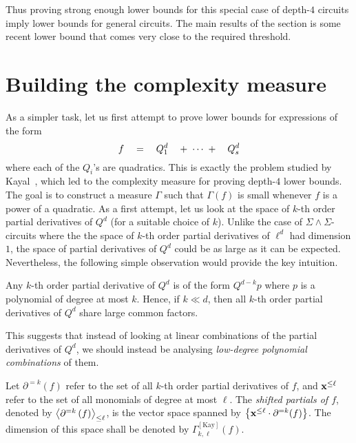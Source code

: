 \documentclass[12pt]{report}
\newcommand{\CM}[1]{\Gamma^{\mathrm{[#1]}}}
\newcommand{\SPD}[3]{\inangle{\partial^{=#1}\inparen{#3}}_{\leq #2}}
\begin{document}
Thus proving strong enough lower bounds for this special case of depth-$4$ circuits imply lower bounds for general circuits. The main results of the section is some recent lower bound \cite{gkks13,KSS13,FLMS13} that comes very close to the required threshold. 

\section{Building the complexity measure}

As a simpler task, let us first attempt to prove lower bounds for expressions of the form
$$
f \quad = \quad Q_1^{d} \quad + \;\cdots\; +  \quad Q_s^{d}
$$
where each of the $Q_i$'s are quadratics. This is exactly the problem studied by Kayal~\cite{k2}, which led to the complexity measure for proving depth-$4$ lower bounds. \\

The goal is to construct a measure $\Gamma$ such that $\Gamma(f)$ is small whenever $f$ is a power of a quadratic. As a first attempt, let us look at the space of $k$-th order partial derivatives of $Q^d$ (for a suitable choice of $k$). Unlike the case of $\Sigma\!\wedge\!\Sigma$-circuits where the the space of $k$-th order partial derivatives of $\ell^d$ had dimension $1$, the space of partial derivatives of $Q^{d}$ could be as large as it can be expected. Nevertheless, the following simple observation would provide the key intuition.

\begin{observation} 
  Any $k$-th order partial derivative of $Q^d$ is of the form $Q^{d-k}p$ where $p$ is a polynomial of degree at most $k$. Hence, if $k \ll d$, then all $k$-th order partial derivatives of $Q^d$ share large common factors.
\end{observation}

This suggests that instead of looking at linear combinations of the partial derivatives of $Q^d$, we should instead be analysing \emph{low-degree polynomial combinations} of them. 
\begin{definition}\label{defn:shifted-partials}
  Let $\partial^{=k}(f)$ refer to the set of all $k$-th order partial derivatives of $f$, and $\mathbf{x}^{\leq \ell}$ refer to the set of all monomials of degree at most $\ell$. The \emph{shifted partials of $f$}, denoted by $\SPD{k}{\ell}{f}$, is the vector space spanned by $\left\{\mathbf{x}^{\leq \ell} \cdot \partial^{=k}(f)\right\}$. The dimension of this space shall be denoted by $\CM{Kay}_{k,\ell}(f)$. 
\end{definition}
\end{document}
